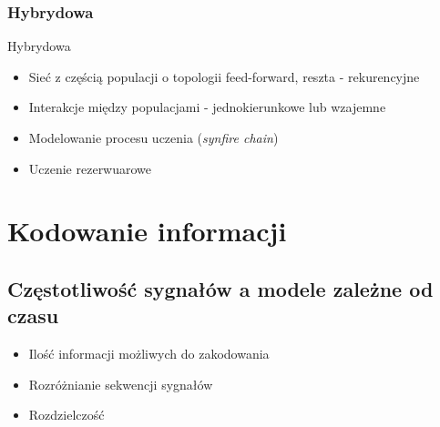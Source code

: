 \documentclass{beamer}
\begin{document}
\subsubsection{Hybrydowa}
\begin{frame}{Hybrydowa}
\begin{itemize}
	\item Sieć z częścią populacji o topologii feed-forward, reszta - rekurencyjne
	\item Interakcje między populacjami - jednokierunkowe lub wzajemne
	\item Modelowanie procesu uczenia (\textit{synfire chain})
	\item Uczenie rezerwuarowe
\end{itemize}
\end{frame}
\section{Kodowanie informacji}
\subsection{Częstotliwość sygnałów a modele zależne od czasu}
\begin{frame}
\begin{itemize}
 	\item Ilość informacji możliwych do zakodowania
 	\item Rozróżnianie sekwencji sygnałów
 	\item Rozdzielczość
\end{itemize}
\end{frame}
\end{document}
